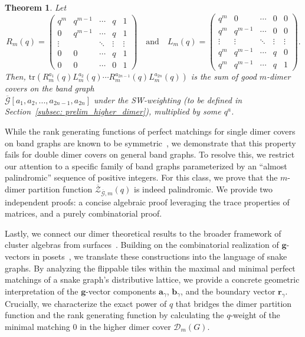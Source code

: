 \documentclass[11pt]{amsart}
\newcommand\m[1]{\begin{pmatrix}#1\end{pmatrix}}
\newtheorem*{thm*}{Theorem}
\theoremstyle{definition}
\theoremstyle{remark}
\numberwithin{equation}{section}
\begin{document}
\begin{thm*}
    Let $$R_{m}(q)=\m{q^m & q^{m-1} & \cdots & q & 1 \\
    0 & q^{m-1} & \cdots & q & 1 \\
    \vdots & & \ddots & \vdots & \vdots \\
    0 & 0 & \cdots & q & 1 \\
    0 & 0 & \cdots & 0 & 1 } \quad \text{and} \quad L_{m}(q)=\m{q^m & 0 & \cdots & 0 & 0 \\
    q^m & q^{m-1} & \cdots & 0 & 0 \\
    \vdots & \vdots & \ddots & \vdots & \vdots \\
    q^m & q^{m-1} & \cdots & q & 0 \\
    q^m & q^{m-1} & \cdots & q & 1}.$$ Then, $\text{tr}(R_m^{a_1}(q)L_m^{a_2}(q)\cdots R_m^{a_{2n-1}}(q)L_m^{a_{2n}}(q))$ is the sum of good $m$-dimer covers on the band graph \\
    $\overline{\mathcal{G}}[a_1,a_2,...,a_{2n-1},a_{2n}]$ under the SW-weighting (to be defined in Section~\ref{subsec: prelim_higher_dimer}), multiplied by some $q^a$. 
\end{thm*}

While the rank generating functions of perfect matchings for single dimer covers on band graphs are known to be symmetric~\cite{fence_posets}, we demonstrate that this property fails for double dimer covers on general band graphs. To resolve this, we restrict our attention to a specific family of band graphs parameterized by an ``almost palindromic'' sequence of positive integers. For this class, we prove that the $m$-dimer partition function $\overline{\mathcal{Z}}_{\overline{\mathcal{G}},m}(q)$ is indeed palindromic. We provide two independent proofs: a concise algebraic proof leveraging the trace properties of matrices, and a purely combinatorial proof.

Lastly, we connect our dimer theoretical results to the broader framework of cluster algebras from surfaces~\cite{FZ2007, MMSV24}. Building on the combinatorial realization of $\mathbf{g}$-vectors in posets~\cite{banaian2024skein}, we translate these constructions into the language of snake graphs. By analyzing the flippable tiles within the maximal and minimal perfect matchings of a snake graph's distributive lattice, we provide a concrete geometric interpretation of the $\mathbf{g}$-vector components $\mathbf{a}_\gamma$, $\mathbf{b}_\gamma$, and the boundary vector $\mathbf{r}_\gamma$. Crucially, we characterize the exact power of $q$ that bridges the dimer partition function and the rank generating function by calculating the $q$-weight of the minimal matching $\hat{0}$ in the higher dimer cover $\mathcal{D}_m(G)$.
\end{document}

